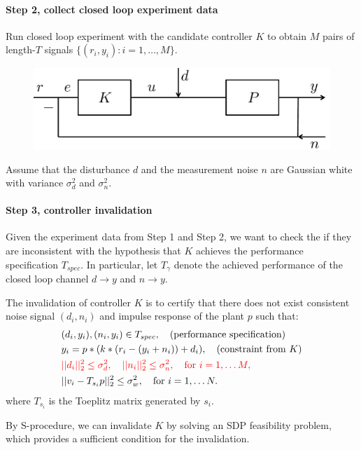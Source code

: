 \documentclass[11pt, onecolumn]{article}
\newcommand{\rb}[1]{{\color{red}{ #1}}}
\begin{document}
\paragraph{Step 2,  collect closed  loop experiment data}
Run closed loop experiment with the candidate controller $K$ to obtain $M$ pairs of length-$T$ signals
$\{(r_i,y_i) : i=1,\dots, M\}$.
\begin{figure}[!ht]
  \centering
  \includegraphics[width=.5\linewidth]{sys2.pdf}
\end{figure}

\begin{assumption}
  Assume that the disturbance $d$ and the measurement noise $n$ are Gaussian white with variance
  $\sigma_d^2$ and $\sigma_n^2$.
\end{assumption}


\paragraph{Step 3, controller invalidation}
Given the experiment data from Step 1 and Step 2, we want to check the if they are inconsistent with
the hypothesis that $K$ achieves the performance specification $T_{spec}$.
%
In particular, let $T_{\gamma}$ denote the achieved performance of the closed loop channel $d\to y$
and $n\to y$.

The invalidation of controller $K$ is to certify that there does not exist consistent noise signal
$(d_i, n_i)$ and impulse response of the plant $p$ such that:
\begin{align*}
  & (d_i,y_i), (n_i,y_i)\in T_{spec}, \quad\tx{(performance specification)}
  \\
  & y_i = p * ( k* (r_i-(y_i+n_i)) +d_i), \quad\tx{(constraint from $K$)}
  \\
  & \rb{||d_i||_2^2\leq \sigma_d^2 , \quad ||n_i||_2^2\leq \sigma_n^2, \quad \tx{for }i=
  1,\dots M,}
  \\
  & ||v_i - T_{s_i}p||_2^2 \leq \sigma_w^2, \quad \tx{for }i= 1,\dots N.
\end{align*}
where $T_{s_i}$ is the Toeplitz matrix generated by $s_i$.

By S-procedure, we can invalidate $K$ by solving an SDP feasibility problem, which provides
a sufficient condition for the invalidation.
\end{document}
